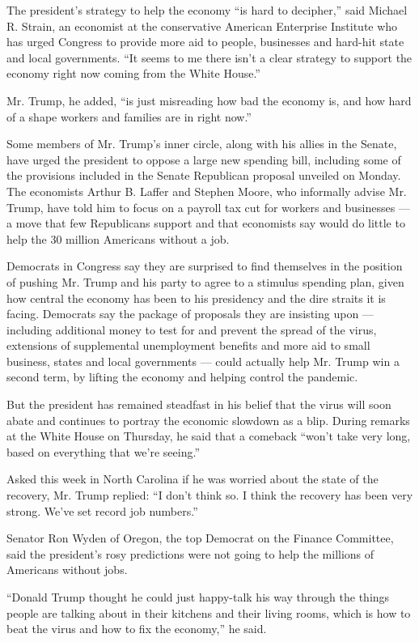 The president's strategy to help the economy ``is hard to decipher,''
said Michael R. Strain, an economist at the conservative American
Enterprise Institute who has urged Congress to provide more aid to
people, businesses and hard-hit state and local governments. ``It seems
to me there isn't a clear strategy to support the economy right now
coming from the White House.''

Mr. Trump, he added, ``is just misreading how bad the economy is, and
how hard of a shape workers and families are in right now.''

Some members of Mr. Trump's inner circle, along with his allies in the
Senate, have urged the president to oppose a large new spending bill,
including some of the provisions included in the Senate Republican
proposal unveiled on Monday. The economists Arthur B. Laffer and Stephen
Moore, who informally advise Mr. Trump, have told him to focus on a
payroll tax cut for workers and businesses --- a move that few
Republicans support and that economists say would do little to help the
30 million Americans without a job.

Democrats in Congress say they are surprised to find themselves in the
position of pushing Mr. Trump and his party to agree to a stimulus
spending plan, given how central the economy has been to his presidency
and the dire straits it is facing. Democrats say the package of
proposals they are insisting upon --- including additional money to test
for and prevent the spread of the virus, extensions of supplemental
unemployment benefits and more aid to small business, states and local
governments --- could actually help Mr. Trump win a second term, by
lifting the economy and helping control the pandemic.

But the president has remained steadfast in his belief that the virus
will soon abate and continues to portray the economic slowdown as a
blip. During remarks at the White House on Thursday, he said that a
comeback ``won't take very long, based on everything that we're
seeing.''

Asked this week in North Carolina if he was worried about the state of
the recovery, Mr. Trump replied: ``I don't think so. I think the
recovery has been very strong. We've set record job numbers.''

Senator Ron Wyden of Oregon, the top Democrat on the Finance Committee,
said the president's rosy predictions were not going to help the
millions of Americans without jobs.

``Donald Trump thought he could just happy-talk his way through the
things people are talking about in their kitchens and their living
rooms, which is how to beat the virus and how to fix the economy,'' he
said.

